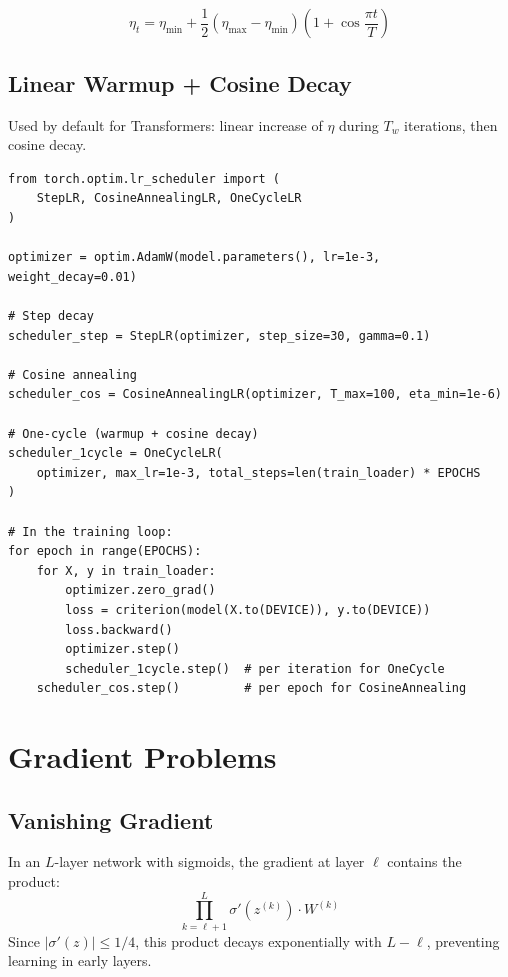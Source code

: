 \[
\eta_t = \eta_{\min} + \frac{1}{2}(\eta_{\max} - \eta_{\min})\left(1 + \cos\frac{\pi t}{T}\right)
\]

\subsection{Linear Warmup + Cosine Decay}

Used by default for Transformers: linear increase of $\eta$ during $T_w$ iterations, then cosine decay.

\begin{codeblock}[title=\textbf{Schedulers in PyTorch}]
\begin{verbatim}
from torch.optim.lr_scheduler import (
    StepLR, CosineAnnealingLR, OneCycleLR
)

optimizer = optim.AdamW(model.parameters(), lr=1e-3, weight_decay=0.01)

# Step decay
scheduler_step = StepLR(optimizer, step_size=30, gamma=0.1)

# Cosine annealing
scheduler_cos = CosineAnnealingLR(optimizer, T_max=100, eta_min=1e-6)

# One-cycle (warmup + cosine decay)
scheduler_1cycle = OneCycleLR(
    optimizer, max_lr=1e-3, total_steps=len(train_loader) * EPOCHS
)

# In the training loop:
for epoch in range(EPOCHS):
    for X, y in train_loader:
        optimizer.zero_grad()
        loss = criterion(model(X.to(DEVICE)), y.to(DEVICE))
        loss.backward()
        optimizer.step()
        scheduler_1cycle.step()  # per iteration for OneCycle
    scheduler_cos.step()         # per epoch for CosineAnnealing
\end{verbatim}
\end{codeblock}

\section{Gradient Problems}
\label{sec:gradient_problems}

\subsection{Vanishing Gradient}

In an $L$-layer network with sigmoids, the gradient at layer $\ell$ contains the product:
\[
\prod_{k=\ell+1}^{L} \sigma'(z^{(k)}) \cdot W^{(k)}
\]
Since $|\sigma'(z)| \leq 1/4$, this product decays exponentially with $L - \ell$, preventing learning in early layers.

